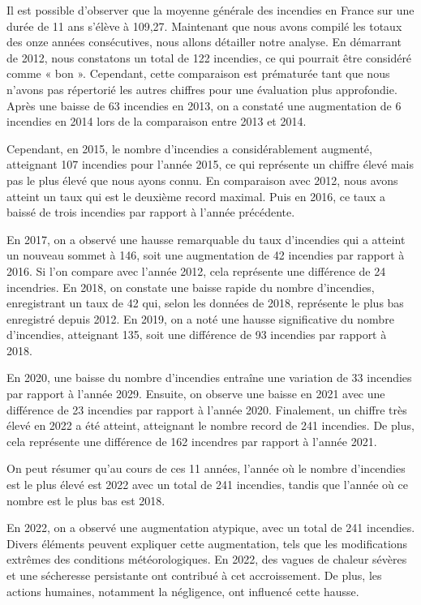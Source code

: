 \documentclass[
]{article}
\begin{document}
Il est possible d'observer que la moyenne générale des incendies en
France sur une durée de 11 ans s'élève à 109,27. Maintenant que nous
avons compilé les totaux des onze années consécutives, nous allons
détailler notre analyse. En démarrant de 2012, nous constatons un total
de 122 incendies, ce qui pourrait être considéré comme « bon ».
Cependant, cette comparaison est prématurée tant que nous n'avons pas
répertorié les autres chiffres pour une évaluation plus approfondie.
Après une baisse de 63 incendies en 2013, on a constaté une augmentation
de 6 incendies en 2014 lors de la comparaison entre 2013 et 2014.

Cependant, en 2015, le nombre d'incendies a considérablement augmenté,
atteignant 107 incendies pour l'année 2015, ce qui représente un chiffre
élevé mais pas le plus élevé que nous ayons connu. En comparaison avec
2012, nous avons atteint un taux qui est le deuxième record maximal.
Puis en 2016, ce taux a baissé de trois incendies par rapport à l'année
précédente.

En 2017, on a observé une hausse remarquable du taux d'incendies qui a
atteint un nouveau sommet à 146, soit une augmentation de 42 incendies
par rapport à 2016. Si l'on compare avec l'année 2012, cela représente
une différence de 24 incendries. En 2018, on constate une baisse rapide
du nombre d'incendies, enregistrant un taux de 42 qui, selon les données
de 2018, représente le plus bas enregistré depuis 2012. En 2019, on a
noté une hausse significative du nombre d'incendies, atteignant 135,
soit une différence de 93 incendies par rapport à 2018.

En 2020, une baisse du nombre d'incendies entraîne une variation de 33
incendies par rapport à l'année 2029. Ensuite, on observe une baisse en
2021 avec une différence de 23 incendies par rapport à l'année 2020.
Finalement, un chiffre très élevé en 2022 a été atteint, atteignant le
nombre record de 241 incendies. De plus, cela représente une différence
de 162 incendres par rapport à l'année 2021.

On peut résumer qu'au cours de ces 11 années, l'année où le nombre
d'incendies est le plus élevé est 2022 avec un total de 241 incendies,
tandis que l'année où ce nombre est le plus bas est 2018.

En 2022, on a observé une augmentation atypique, avec un total de 241
incendies. Divers éléments peuvent expliquer cette augmentation, tels
que les modifications extrêmes des conditions météorologiques. En 2022,
des vagues de chaleur sévères et une sécheresse persistante ont
contribué à cet accroissement. De plus, les actions humaines, notamment
la négligence, ont influencé cette hausse.
\end{document}
